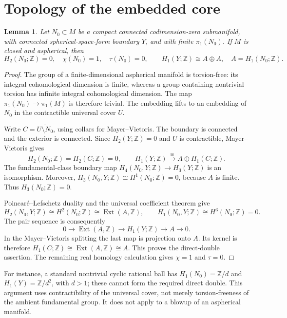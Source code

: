 \documentclass[11pt]{article}
\newtheorem{lemma}[theorem]{Lemma}
\newcommand{\Z}{\mathbb Z}
\begin{document}
\section{Topology of the embedded core}
\begin{lemma}\label{lem:topology}
Let $N_0\subset M$ be a compact connected codimension-zero submanifold, with
connected spherical-space-form boundary $Y$, and with finite $\pi_1(N_0)$.
If $M$ is closed and aspherical, then
\[
 H_2(N_0;\Z)=0,\quad \chi(N_0)=1,\quad \tau(N_0)=0,
 \qquad H_1(Y;\Z)\cong A\oplus A,
 \quad A=H_1(N_0;\Z).
\]
\end{lemma}
\begin{proof}
The group of a finite-dimensional aspherical manifold is torsion-free:
its integral cohomological dimension is finite, whereas a group containing
nontrivial torsion has infinite integral cohomological dimension. The map
$\pi_1(N_0)\to\pi_1(M)$ is therefore trivial. The embedding lifts to an
embedding of $N_0$ in the contractible universal cover $U$.

Write $C=\overline{U\setminus N_0}$, using collars for Mayer--Vietoris.
The boundary is connected and the exterior is connected.
Since $H_2(Y;\Z)=0$ and $U$ is contractible, Mayer--Vietoris gives
\[
 H_2(N_0;\Z)=H_2(C;\Z)=0,\qquad
 H_1(Y;\Z)\xrightarrow{\ \cong\ } A\oplus H_1(C;\Z).
\]
The fundamental-class boundary map
$H_4(N_0,Y;\Z)\to H_3(Y;\Z)$ is an isomorphism.
Moreover, $H_3(N_0,Y;\Z)\cong H^1(N_0;\Z)=0$, because $A$ is finite.
Thus $H_3(N_0;\Z)=0$.

Poincar\'e--Lefschetz duality and the universal coefficient theorem give
\[
 H_2(N_0,Y;\Z)\cong H^2(N_0;\Z)\cong\operatorname{Ext}(A,\Z),
 \qquad H_1(N_0,Y;\Z)\cong H^3(N_0;\Z)=0.
\]
The pair sequence is consequently
\[
 0\longrightarrow\operatorname{Ext}(A,\Z)
 \longrightarrow H_1(Y;\Z)\longrightarrow A\longrightarrow0.
\]
In the Mayer--Vietoris splitting the last map is projection onto $A$.
Its kernel is therefore $H_1(C;\Z)\cong\operatorname{Ext}(A,\Z)\cong A$.
This proves the direct-double assertion. The remaining real homology
calculation gives $\chi=1$ and $\tau=0$.
\end{proof}

For instance, a standard nontrivial cyclic rational ball has
$H_1(N_0)=\Z/d$ and $H_1(Y)=\Z/d^2$, with $d>1$; these cannot form the
required direct double. This argument uses contractibility of the universal
cover, not merely torsion-freeness of the ambient fundamental group.
It does not apply to a blowup of an aspherical manifold.
\end{document}
